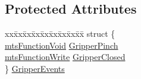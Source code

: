 \subsection*{Protected Attributes}
\begin{DoxyCompactItemize}
\item 
\begin{tabbing}
xx\=xx\=xx\=xx\=xx\=xx\=xx\=xx\=xx\=\kill
struct \{\\
\>\hyperlink{classmts_function_void}{mtsFunctionVoid} \hyperlink{classmts_intuitive_research_kit_m_t_m_acf5b18a7bb385172688a4f8fafcc24d7}{GripperPinch}\\
\>\hyperlink{classmts_function_write}{mtsFunctionWrite} \hyperlink{classmts_intuitive_research_kit_m_t_m_ac2406f66a4880a35ef854e85843d4c8e}{GripperClosed}\\
\} \hyperlink{classmts_intuitive_research_kit_m_t_m_a8db38299cd1c075a9a042ce462c6578e}{GripperEvents}\\


\end{tabbing}
\end{DoxyCompactItemize}
